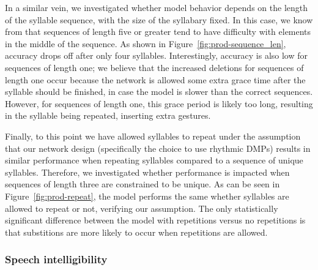 In a similar vein,
we investigated whether model behavior
depends on the length of the syllable sequence,
with the size of the syllabary fixed.
In this case, we know from \citet{choo2010}
that sequences of length five or greater
tend to have difficulty with elements
in the middle of the sequence.
As shown in Figure~\ref{fig:prod-sequence_len},
accuracy drops off after only four syllables.
Interestingly, accuracy is also low
for sequences of length one;
we believe that the increased deletions
for sequences of length one occur
because the network is allowed some
extra grace time after the syllable should
be finished, in case the model
is slower than the correct sequences.
However, for sequences of length one,
this grace period is likely too long,
resulting in the syllable
being repeated,
inserting extra gestures.


Finally, to this point we have
allowed syllables to repeat
under the assumption that our network design
(specifically the choice to use rhythmic DMPs)
results in similar performance when
repeating syllables compared to
a sequence of unique syllables.
Therefore, we investigated whether
performance is impacted when
sequences of length three
are constrained to be unique.
As can be seen in Figure~\ref{fig:prod-repeat},
the model performs the same
whether syllables are allowed to repeat or not,
verifying our assumption.
The only statistically significant difference
between the model with repetitions
versus no repetitions
is that substitions are more likely
to occur when repetitions are allowed.

\subsubsection{Speech intelligibility}

